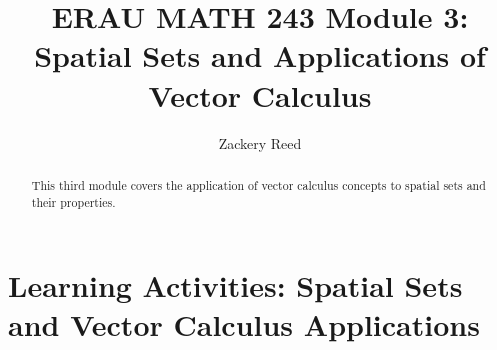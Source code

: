 \documentclass{xourse}
\title{ERAU MATH 243 Module 3: Spatial Sets and Applications of Vector Calculus}
\author{Zackery Reed}
\begin{document}
\begin{abstract}
This third module covers the application of vector calculus concepts to spatial sets and their properties.
\end{abstract}
\maketitle

\part{Learning Activities: Spatial Sets and Vector Calculus Applications}
\sectionstyle

\end{document}
